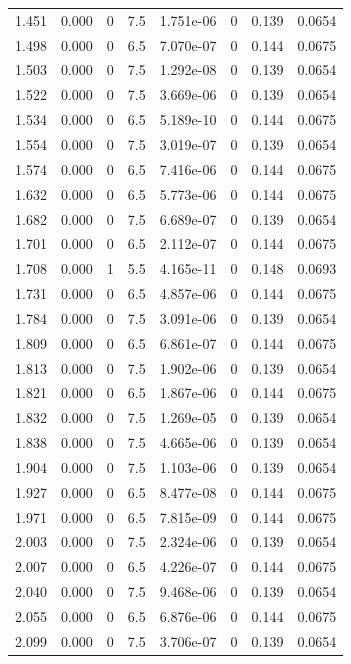 \documentclass[preview]{standalone}
\begin{document}
{{{\begin{tabular}{L{1.2cm}C{1.2cm} C{0.3cm}C{0.5cm} C{1.4cm}C{1.4cm} C{1.4cm}C{1.4cm}}
  1.451  &  0.000  & 0     & 7.5 &  1.751e-06  & 0  & 0.139 &  0.0654   \\ 
  1.498  &  0.000  & 0     & 6.5 &  7.070e-07  & 0  & 0.144 &  0.0675   \\ 
  1.503  &  0.000  & 0     & 7.5 &  1.292e-08  & 0  & 0.139 &  0.0654   \\ 
  1.522  &  0.000  & 0     & 7.5 &  3.669e-06  & 0  & 0.139 &  0.0654   \\ 
  1.534  &  0.000  & 0     & 6.5 &  5.189e-10  & 0  & 0.144 &  0.0675   \\ 
  1.554  &  0.000  & 0     & 7.5 &  3.019e-07  & 0  & 0.139 &  0.0654   \\ 
  1.574  &  0.000  & 0     & 6.5 &  7.416e-06  & 0  & 0.144 &  0.0675   \\ 
  1.632  &  0.000  & 0     & 6.5 &  5.773e-06  & 0  & 0.144 &  0.0675   \\ 
  1.682  &  0.000  & 0     & 7.5 &  6.689e-07  & 0  & 0.139 &  0.0654   \\ 
  1.701  &  0.000  & 0     & 6.5 &  2.112e-07  & 0  & 0.144 &  0.0675   \\ 
  1.708  &  0.000  & 1     & 5.5 &  4.165e-11  & 0  & 0.148 &  0.0693   \\ 
  1.731  &  0.000  & 0     & 6.5 &  4.857e-06  & 0  & 0.144 &  0.0675   \\ 
  1.784  &  0.000  & 0     & 7.5 &  3.091e-06  & 0  & 0.139 &  0.0654   \\ 
  1.809  &  0.000  & 0     & 6.5 &  6.861e-07  & 0  & 0.144 &  0.0675   \\ 
  1.813  &  0.000  & 0     & 7.5 &  1.902e-06  & 0  & 0.139 &  0.0654   \\ 
  1.821  &  0.000  & 0     & 6.5 &  1.867e-06  & 0  & 0.144 &  0.0675   \\ 
  1.832  &  0.000  & 0     & 7.5 &  1.269e-05  & 0  & 0.139 &  0.0654   \\ 
  1.838  &  0.000  & 0     & 7.5 &  4.665e-06  & 0  & 0.139 &  0.0654   \\ 
  1.904  &  0.000  & 0     & 7.5 &  1.103e-06  & 0  & 0.139 &  0.0654   \\ 
  1.927  &  0.000  & 0     & 6.5 &  8.477e-08  & 0  & 0.144 &  0.0675   \\ 
  1.971  &  0.000  & 0     & 6.5 &  7.815e-09  & 0  & 0.144 &  0.0675   \\ 
  2.003  &  0.000  & 0     & 7.5 &  2.324e-06  & 0  & 0.139 &  0.0654   \\ 
  2.007  &  0.000  & 0     & 6.5 &  4.226e-07  & 0  & 0.144 &  0.0675   \\ 
  2.040  &  0.000  & 0     & 7.5 &  9.468e-06  & 0  & 0.139 &  0.0654   \\ 
  2.055  &  0.000  & 0     & 6.5 &  6.876e-06  & 0  & 0.144 &  0.0675   \\ 
  2.099  &  0.000  & 0     & 7.5 &  3.706e-07  & 0  & 0.139 &  0.0654   \\ 
\hline 
\end{tabular} 

}}}
\end{document}
